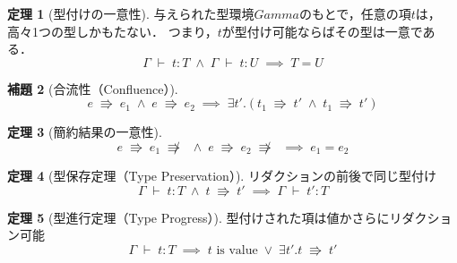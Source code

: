 \documentclass[a4j, dvipdfmx]{jsarticle}
\theoremstyle{definition}
\newtheorem{theo}{定理}
\newtheorem{lem}[theo]{補題}
\newtheorem{prop}[theo]{命題}
\newcommand{\sequent}[2]{#1 \;\vdash\; #2}
\newcommand{\reduction}[2]{#1 \;\Rrightarrow\; #2}
\begin{document}
\begin{theo}[型付けの一意性]
与えられた型環境$Gamma$のもとで，任意の項$t$は，高々1つの型しかもたない．
つまり，$t$が型付け可能ならばその型は一意である．
\begin{equation*}
  \sequent{\Gamma}{t:T} \;\land\; \sequent{\Gamma}{t:U} \;\implies\; T = U
\end{equation*}
\end{theo}

\begin{lem}[合流性（Confluence）]
\begin{equation*}
  \reduction{e}{e_1} \;\land\; \reduction{e}{e_2} \;\implies\; \exists t'.(\reduction{t_1}{t'} \;\land\; \reduction{t_1}{t'})
\end{equation*}
\end{lem}

\begin{theo}[簡約結果の一意性]
\begin{equation*}
  e\;\Rrightarrow\;e_1\;\not\Rrightarrow\; \;\land\; e\;\Rrightarrow\;e_2\;\not\Rrightarrow\; \;\implies\; e_1 = e_2
\end{equation*}
\end{theo}

\begin{theo}[型保存定理（Type Preservation）]
リダクションの前後で同じ型付け
\begin{equation*}
  \sequent{\Gamma}{t:T} \;\land\; \reduction{t}{t'} \;\implies\; \sequent{\Gamma}{t':T}
\end{equation*}
\end{theo}

\begin{theo}[型進行定理（Type Progress）]
型付けされた項は値かさらにリダクション可能
\begin{equation*}
  \sequent{\Gamma}{t:T} \;\implies\; \text{$t$ is value} \;\lor\; \exists t'.\reduction{t}{t'}
\end{equation*}
\end{theo}





\end{document}
